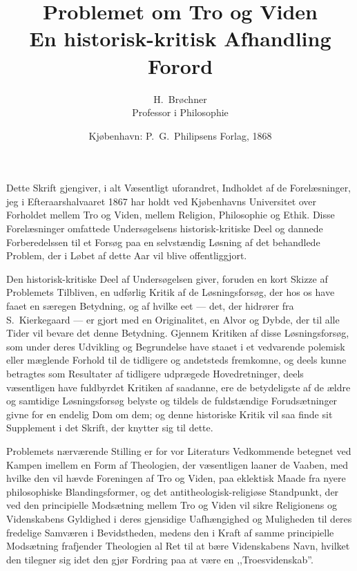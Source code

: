 \documentclass[12pt,a4paper]{article}
\title{\textbf{Problemet om Tro og Viden}\\[6pt]
  \large En historisk-kritisk Afhandling\\[10pt]
  \normalsize Forord}
\author{H.\ Brøchner\\[4pt]
  \small Professor i Philosophie}
\date{Kjøbenhavn: P.\ G.\ Philipsens Forlag, 1868}
\begin{document}
\maketitle
\thispagestyle{fancy}

\bigskip

\noindent Dette Skrift gjengiver, i alt Væsentligt uforandret,
Indholdet af de Forelæsninger, jeg i Efteraarshalvaaret 1867 har holdt
ved Kjøbenhavns Universitet over Forholdet mellem Tro og Viden, mellem
Religion, Philosophie og Ethik. Disse Forelæsninger omfattede
Undersøgelsens historisk-kritiske Deel og dannede Forberedelssen til et
Forsøg paa en selvstændig Løsning af det behandlede Problem, der i
Løbet af dette Aar vil blive offentliggjort.

Den historisk-kritiske Deel af Undersøgelsen giver, foruden en kort
Skizze af Problemets Tilbliven, en udførlig Kritik af de
Løsningsforsøg, der hos os have faaet en særegen Betydning, og af
hvilke eet --- det, der hidrører fra S.\ Kierkegaard --- er gjort med
en Originalitet, en Alvor og Dybde, der til alle Tider vil bevare det
denne Betydning. Gjennem Kritiken af disse Løsningsforsøg, som under
deres Udvikling og Begrundelse have staaet i et vedvarende polemisk
eller mæglende Forhold til de tidligere og andetsteds fremkomne, og
deels kunne betragtes som Resultater af tidligere udprægede
Hovedretninger, deels væsentligen have fuldbyrdet Kritiken af
saadanne, ere de betydeligste af de ældre og samtidige Løsningsforsøg
belyste og tildels de fuldstændige Forudsætninger givne for en endelig
Dom om dem; og denne historiske Kritik vil saa finde sit Supplement i
det Skrift, der knytter sig til dette.

Problemets nærværende Stilling er for vor Literaturs Vedkommende
betegnet ved Kampen imellem en Form af Theologien, der væsentligen
laaner de Vaaben, med hvilke den vil hævde Foreningen af Tro og Viden,
paa eklektisk Maade fra nyere philosophiske Blandingsformer, og det
antitheologisk-religiøse Standpunkt, der ved den principielle
Modsætning mellem Tro og Viden vil sikre Religionens og Videnskabens
Gyldighed i deres gjensidige Uafhængighed og Muligheden til deres
fredelige Samværen i Bevidstheden, medens den i Kraft af samme
principielle Modsætning frafjender Theologien al Ret til at bære
Videnskabens Navn, hvilket den tilegner sig idet den gjør Fordring paa
at være en ,,Troesvidenskab''.
\end{document}
